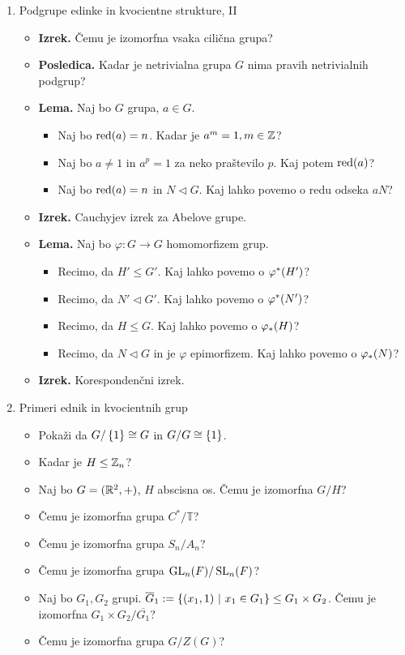\begin{enumerate}
    \item Podgrupe edinke in kvocientne strukture, II 
    \begin{itemize}
        \item \colorbox{blue!30}{\textbf{Izrek.}} Čemu je izomorfna vsaka cilična grupa?
        \item \colorbox{orange!30}{\textbf{Posledica.}} Kadar je netrivialna grupa $G$ nima pravih netrivialnih podgrup?
        \item \colorbox{blue!30}{\textbf{Lema.}} Naj bo $G$ grupa, $a \in G$.
        \begin{itemize}
            \item Naj bo $\operatorname{red} (a) = n$. Kadar je $a^m = 1, m \in \mathbb{Z}$?
            \item Naj bo $a \neq 1$ in $a^p = 1$ za neko praštevilo $p$. Kaj potem $\operatorname{red} (a)$?
            \item Naj bo $\operatorname{red} (a) = n$ in $N \lhd G$. Kaj lahko povemo o redu odseka $aN$?
        \end{itemize}
        \item \colorbox{blue!30}{\textbf{Izrek.}} Cauchyjev izrek za Abelove grupe.
        \item \colorbox{blue!30}{\textbf{Lema.}} Naj bo $\varphi: G \to G$ homomorfizem grup.
        \begin{itemize}
            \item Recimo, da $H' \leq G'$. Kaj lahko povemo o $\varphi^{*}(H')$?
            \item Recimo, da $N' \lhd G'$. Kaj lahko povemo o $\varphi^{*}(N')$?
            \item Recimo, da $H \leq G$. Kaj lahko povemo o $\varphi_{*}(H)$?
            \item Recimo, da $N \lhd G$ in je $\varphi$ epimorfizem. Kaj lahko povemo o $\varphi_{*}(N)$?
        \end{itemize}
        \item \colorbox{blue!30}{\textbf{Izrek.}} Korespondenčni izrek.
    \end{itemize}

    \item Primeri ednik in kvocientnih grup
    \begin{itemize}
        \item Pokaži da $G/ \left\{1\right\} \cong G$ in $G/G \cong \left\{1\right\}$.
        \item Kadar je $H \leq \mathbb{Z}_n$?
        \item Naj bo $G = (\mathbb{R}^2, +)$, $H$ abscisna os. Čemu je izomorfna $G/H$?
        \item Čemu je izomorfna grupa $C^*/\mathbb{T}$?
        \item Čemu je izomorfna grupa $S_n/A_n$?
        \item Čemu je izomorfna grupa $\operatorname{GL}_n(F)/\operatorname{SL}_n(F)$?
        \item Naj bo $G_1, G_2$ grupi. $\overline{G}_1 := \left\{(x_1, 1) \ | \ x_1 \in G_1\right\} \leq G_1 \times G_2$. Čemu je izomorfna $G_1 \times G_2/\overline{G_1}$?
        \item Čemu je izomorfna grupa $G/Z(G)$?
    \end{itemize}


\end{enumerate}
